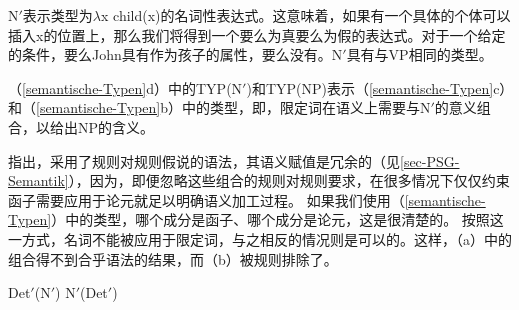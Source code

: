 N$'$表示类型为$\lambda$x child(x)的名词性表达式。这意味着，如果有一个具体的个体可以插入x的位置上，那么我们将得到一个要么为真要么为假的表达式。对于一个给定的条件，要么John具有作为孩子的属性，要么没有。N$'$具有与VP相同的类型。

（\ref{semantische-Typen}d）中的TYP(N$'$)和TYP(NP)表示（\ref{semantische-Typen}c）和（\ref{semantische-Typen}b）中的类型，即，限定词在语义上需要与N$'$的意义组合，以给出NP的含义。

 \citet*[]{GKPS85a}指出，采用了规则对规则假说的语法，其语义赋值是冗余的（见\ref{sec-PSG-Semantik}），因为，即便忽略这些组合的规则对规则要求，在很多情况下仅仅约束函子需要应用于论元就足以明确语义加工过程。
如果我们使用（\ref{semantische-Typen}）中的类型，哪个成分是函子、哪个成分是论元，这是很清楚的。
按照这一方式，名词不能被应用于限定词，与之相反的情况则是可以的。这样，（a）中的组合得不到合乎语法的结果，而（b）被规则排除了。

\begin{samepage}
\eal
\ex Det$'$(N$'$)
\ex N$'$(Det$'$)
\zl
\end{samepage}

